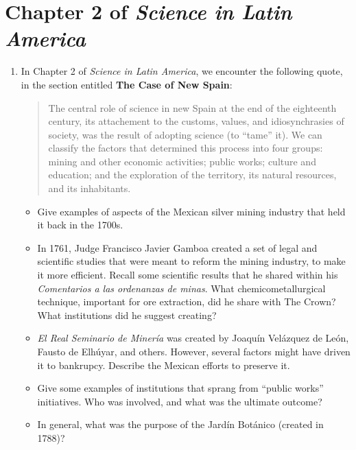 \documentclass[12pt]{article}
\begin{document}
\maketitle

\section{Chapter 2 of \textit{Science in Latin America}}

\begin{enumerate}
\item In Chapter 2 of \textit{Science in Latin America}, we encounter the following quote, in the section entitled \textbf{The Case of New Spain}:
\begin{quotation}
The central role of science in new Spain at the end of the eighteenth century, its attachement to the customs, values, and idiosynchrasies of society, was the result of adopting science (to ``tame'' it).  We can classify the factors that determined this process into four groups: mining and other economic activities; public works; culture and education; and the exploration of the territory, its natural resources, and its inhabitants.
\end{quotation}
\begin{itemize}
\item Give examples of aspects of the Mexican silver mining industry that held it back in the 1700s. \\ \vspace{1.0cm}
\item In 1761, Judge Francisco Javier Gamboa created a set of legal and scientific studies that were meant to reform the mining industry, to make it more efficient.  Recall some scientific results that he shared within his \textit{Comentarios a las ordenanzas de minas}.  What chemicometallurgical technique, important for ore extraction, did he share with The Crown?  What institutions did he suggest creating? \\ \vspace{1.0cm}
\item \textit{El Real Seminario de Miner\'{i}a} was created by Joaqu\'{i}n Vel\'{a}zquez de Le\'{o}n, Fausto de Elh\'{u}yar, and others.  However, several factors might have driven it to bankrupcy.  Describe the Mexican efforts to preserve it. \\ \vspace{1.0cm}
\item Give some examples of institutions that sprang from ``public works'' initiatives.  Who was involved, and what was the ultimate outcome? \\ \vspace{1cm}
\item In general, what was the purpose of the Jard\'{i}n Bot\'{a}nico (created in 1788)?
\end{itemize}
\end{enumerate}
\end{document}
